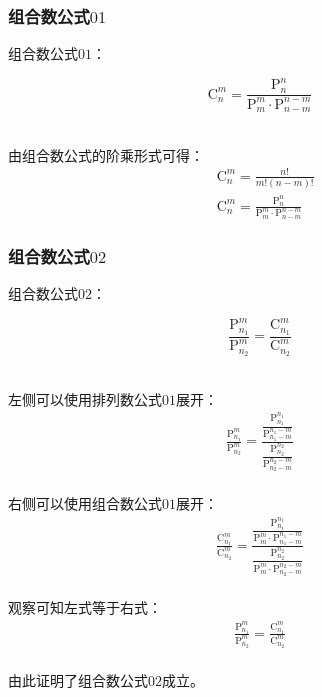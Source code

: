 \documentclass[UTF8]{ctexart}
\newcommand{\Pe}{\mathrm{P}}
\newcommand{\Co}{\mathrm{C}}
\begin{document}
\subsubsection{组合数公式$01$}
    组合数公式$01$：
    \begin{large}
        \begin{equation*}
            \Co_n^m=\frac{\Pe_n^n}{\Pe_m^m\cdot\Pe_{n-m}^{n-m}}
        \end{equation*}
    \end{large}\\
    由组合数公式的阶乘形式可得：
    \setcounter{equation}{0}
    \begin{align}
        &\Co_n^m=\frac{n!}{m!(n-m)!}\\[3mm]
        &\Co_n^m=\frac{\Pe_n^n}{\Pe_m^m\cdot\Pe_{n-m}^{n-m}}
    \end{align}\vspace{2pt}

\subsubsection{组合数公式$02$}
    组合数公式$02$：
    \begin{large}
        \begin{equation*}
            \frac{\Pe_{n_1}^m}{\Pe_{n_2}^m}=\frac{\Co_{n_1}^m}{\Co_{n_2}^m}
        \end{equation*}
    \end{large}\\
    左侧可以使用排列数公式$01$展开：
    \setcounter{equation}{0}
    \begin{align}
        \frac{\Pe_{n_1}^m}{\Pe_{n_2}^m}=\frac{\dfrac{\Pe_{n_1}^{n_1}}{\Pe_{n_1-m}^{n_1-m}}}{\dfrac{\Pe_{n_2}^{n_2}}{\Pe_{n_2-m}^{n_2-m}}}
    \end{align}\\
    右侧可以使用组合数公式$01$展开：
    \begin{align}
        \frac{\Co_{n_1}^m}{\Co_{n_2}^m}=\frac{\dfrac{\Pe_{n_1}^{n_1}}{\Pe_m^m\cdot\Pe_{n_1-m}^{n_1-m}}}{\dfrac{\Pe_{n_2}^{n_2}}{\Pe_m^m\cdot\Pe_{n_2-m}^{n_2-m}}}
    \end{align}\\
    观察可知左式等于右式：
    \begin{align}
        \frac{\Pe_{n_1}^m}{\Pe_{n_2}^m}=\frac{\Co_{n_1}^m}{\Co_{n_2}^m}
    \end{align}\\
    由此证明了组合数公式$02$成立。

\newpage
\end{document}
